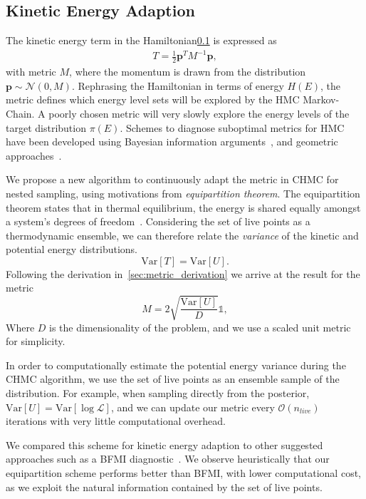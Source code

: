 \documentclass[11pt]{article}
\begin{document}
    \subsection{Kinetic Energy Adaption}
    The kinetic energy term in the Hamiltonian\ref{} is expressed as
    \begin{equation}\label{eq:kinetic_energy}
    \begin{aligned}
        T = \frac{1}{2} \mathbf{p}^T M^{-1} \mathbf{p},
    \end{aligned}
    \end{equation}
    with metric $M$, where the momentum is drawn from the distribution $\mathbf{p} \sim \mathcal{N}(0, M)$.
    Rephrasing the Hamiltonian in terms of energy $H(E)$, the metric defines which energy level sets will be explored
    by the HMC Markov-Chain.
    A poorly chosen metric will very slowly explore the energy levels of the target distribution $\pi(E)$.
    Schemes to diagnose suboptimal metrics for HMC have been developed using Bayesian information
    arguments~\cite{betancourt2016energymetric}, and geometric approaches~\cite{bales2019_hmc_metric}.

    We propose a new algorithm to continuously adapt the metric in CHMC for nested sampling, using motivations
    from \emph{equipartition theorem}.
    The equipartition theorem states that in thermal equilibrium, the energy is shared equally amongst a system's degrees
    of freedom~\cite{landau1972theoretical}.
    Considering the set of live points as a thermodynamic ensemble, we can therefore relate the \emph{variance} of the
    kinetic and potential energy distributions.
    \begin{equation}\label{eq:equipartition_theorem}
        \mathrm{Var}[T] = \mathrm{Var}[U].
    \end{equation}
    Following the derivation in~\ref{sec:metric_derivation} we arrive at the result for the metric
    \begin{equation}\label{eq:metric_adaption}
        M = 2 \sqrt{\frac{\mathrm{Var}[U]}{D}} \mathbb{1},
    \end{equation}
    Where $D$ is the dimensionality of the problem, and we use a scaled unit metric for simplicity.

    In order to computationally estimate the potential energy variance during the CHMC algorithm, we use the
    set of live points as an ensemble sample of the distribution.
    For example, when sampling directly from the posterior, $\mathrm{Var}[U] = \mathrm{Var}[\log{\mathcal{L}}]$,
    and we can update our metric every $\mathcal{O}(n_{live})$ iterations with very little computational overhead.

    We compared this scheme for kinetic energy adaption to other suggested approaches such as a BFMI
    diagnostic~\cite{betancourt2016energymetric}.
    We observe heuristically that our equipartition scheme performs better than BFMI, with lower
    computational cost, as we exploit the natural information contained by the set of live points.
\end{document}
